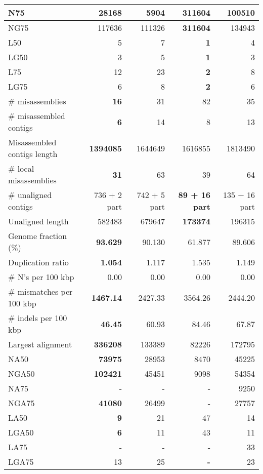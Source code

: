 \documentclass[12pt,a4paper]{article}
\begin{document}
\begin{table}[ht]
\begin{center}
\begin{tabular}{|l*{4}{|r}|}
N75 & 28168 & 5904 & {\bf 311604} & 100510 \\ \hline
NG75 & 117636 & 111326 & {\bf 311604} & 134943 \\ \hline
L50 & 5 & 7 & {\bf 1} & 4 \\ \hline
LG50 & 3 & 5 & {\bf 1} & 3 \\ \hline
L75 & 12 & 23 & {\bf 2} & 8 \\ \hline
LG75 & 6 & 8 & {\bf 2} & 6 \\ \hline
\# misassemblies & {\bf 16} & 31 & 82 & 35 \\ \hline
\# misassembled contigs & {\bf 6} & 14 & 8 & 13 \\ \hline
Misassembled contigs length & {\bf 1394085} & 1644649 & 1616855 & 1813490 \\ \hline
\# local misassemblies & {\bf 31} & 63 & 39 & 64 \\ \hline
\# unaligned contigs & 736 + 2 part & 742 + 5 part & {\bf 89 + 16 part} & 135 + 16 part \\ \hline
Unaligned length & 582483 & 679647 & {\bf 173374} & 196315 \\ \hline
Genome fraction (\%) & {\bf 93.629} & 90.130 & 61.877 & 89.606 \\ \hline
Duplication ratio & {\bf 1.054} & 1.117 & 1.535 & 1.149 \\ \hline
\# N's per 100 kbp & 0.00 & 0.00 & 0.00 & 0.00 \\ \hline
\# mismatches per 100 kbp & {\bf 1467.14} & 2427.33 & 3564.26 & 2444.20 \\ \hline
\# indels per 100 kbp & {\bf 46.45} & 60.93 & 84.46 & 67.87 \\ \hline
Largest alignment & {\bf 336208} & 133389 & 82226 & 172795 \\ \hline
NA50 & {\bf 73975} & 28953 & 8470 & 45225 \\ \hline
NGA50 & {\bf 102421} & 45451 & 9098 & 54354 \\ \hline
NA75 & - & - & - & 9250 \\ \hline
NGA75 & {\bf 41080} & 26499 & - & 27757 \\ \hline
LA50 & {\bf 9} & 21 & 47 & 14 \\ \hline
LGA50 & {\bf 6} & 11 & 43 & 11 \\ \hline
LA75 & - & - & - & 33 \\ \hline
LGA75 & 13 & 25 & {\bf -} & 23 \\ \hline
\end{tabular}
\end{center}
\end{table}
\end{document}
